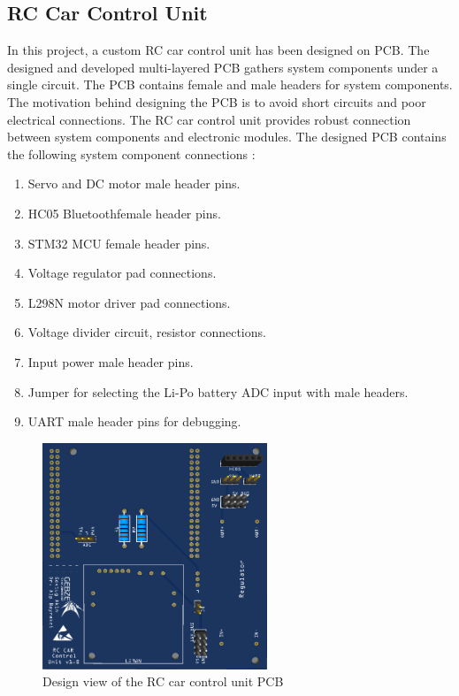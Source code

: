 
\subsection{RC Car Control Unit}
\label{sec_rc_control_unit}
In this project, a custom RC car control unit has been designed on PCB. The designed and developed multi-layered PCB gathers system components under a single circuit. The PCB contains female and male headers for system components. The motivation behind designing the PCB is to avoid short circuits and poor electrical connections. The RC car control unit provides robust connection between system components and electronic modules. The designed PCB contains the following system component connections :
\begin{enumerate}
    \item Servo and DC motor male header pins.
    \item HC05 Bluetooth\texttrademark\;female header pins.
    \item STM32 MCU female header pins.
    \item Voltage regulator pad connections.
    \item L298N motor driver pad connections.
    \item Voltage divider circuit, resistor connections.
    \item Input power male header pins.
    \item Jumper for selecting the Li-Po battery ADC input with male headers.
    \item UART male header pins for debugging.
\end{enumerate}


\begin{figure}[!htbp]
    \centering
    \includegraphics[width=0.6\textwidth]{Imgs/pcb.png}
    \caption{\label{fig:custom_pcb}Design view of the RC car control unit PCB}
\end{figure}

